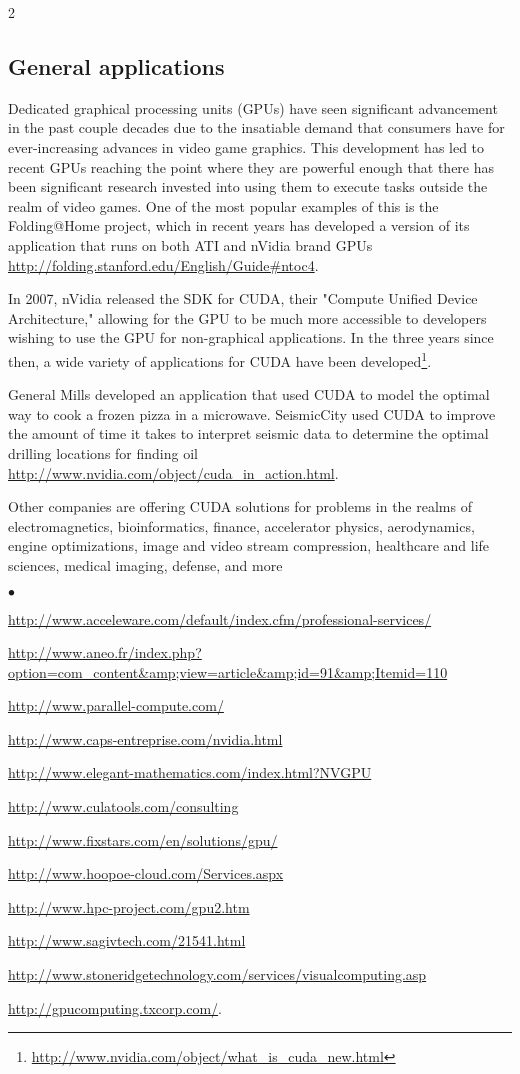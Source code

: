 \documentclass[letterpaper,10pt]{article}
\newcommand{\squishlist}{\begin{list}{$\bullet$}
  {\setlength{\itemsep}{0pt}
    \setlength{\parsep}{3pt}
    \setlength{\topsep}{3pt}
    \setlength{\partopsep}{0pt}
    \setlength{\leftmargin}{1.5em}
    \setlength{\labelwidth}{1em}
    \setlength{\labelsep}{0.5em}}}
\newcommand{\squishend}{\end{list}}
\begin{document}
\begin{multicols}{2}
\subsection{General applications}
  
  Dedicated graphical processing units (GPUs) have seen significant advancement
in the past couple decades due to the insatiable demand that consumers have for
ever-increasing advances in video game graphics. This development has led to
recent GPUs reaching the point where they are powerful enough that there has
been significant research invested into using them to execute tasks outside the
realm of video games. One of the most popular examples of this is the
Folding@Home project, which in recent years has developed a version of its
application that runs on both ATI and nVidia brand GPUs
\url{http://folding.stanford.edu/English/Guide#ntoc4}.
  
  In 2007, nVidia released the SDK for CUDA, their "Compute Unified Device
Architecture," allowing for the GPU to be much more accessible to developers
wishing to use the GPU for non-graphical applications. In the three years since
then, a wide variety of applications for CUDA have been developed\footnote{\url{http://www.nvidia.com/object/what\_is\_cuda\_new.html}}.
  
  General Mills developed an application that used CUDA to model the optimal
way to cook a frozen pizza in a microwave. SeismicCity used CUDA to improve the
amount of time it takes to interpret seismic data to determine the optimal
drilling locations for finding oil
\url{http://www.nvidia.com/object/cuda\_in\_action.html}.
  
  Other companies are offering CUDA solutions for problems in the realms of
electromagnetics, bioinformatics, finance, accelerator physics, aerodynamics,
engine optimizations, image and video stream compression, healthcare and life
sciences, medical imaging, defense, and more
\squishlist
\item \url{http://www.acceleware.com/default/index.cfm/professional-services/}
\item \url{http://www.aneo.fr/index.php?option=com\_content&amp;view=article&amp;id=91&amp;Itemid=110}
\item \url{http://www.parallel-compute.com/}
\item \url{http://www.caps-entreprise.com/nvidia.html}
\item \url{http://www.elegant-mathematics.com/index.html?NVGPU}
\item \url{http://www.culatools.com/consulting}
\item \url{http://www.fixstars.com/en/solutions/gpu/}
\item \url{http://www.hoopoe-cloud.com/Services.aspx}
\item \url{http://www.hpc-project.com/gpu2.htm}
\item \url{http://www.sagivtech.com/21541.html}
\item \url{http://www.stoneridgetechnology.com/services/visualcomputing.asp}
\item \url{http://gpucomputing.txcorp.com/}.
\squishend
  

\end{multicols}
\end{document}
